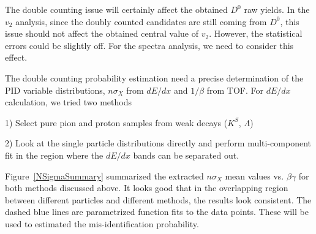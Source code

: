 The double counting issue will certainly affect the obtained $D^0$ raw yields. In the $v_2$ analysis, since the doubly counted candidates are still coming from $D^0$, this issue should not affect the obtained central value of $v_2$. However, the statistical errors could be slightly off. For the spectra analysis, we need to consider this effect.

The double counting probability estimation need a precise determination of the PID variable distributions, $n\sigma_X$ from $dE/dx$ and $1/\beta$ from TOF. For $dE/dx$ calculation, we tried two methods

1) Select pure pion and proton samples from weak decays ($K^{S}$, $\Lambda$)

2) Look at the single particle distributions directly and perform multi-component fit in the region where the $dE/dx$ bands can be separated out.

Figure~\ref{NSigmaSummary} summarized the extracted $n\sigma_{X}$ mean values vs. $\beta\gamma$ for both methods discussed above. It looks good that in the overlapping region between different particles and different methods, the results look consistent. The dashed blue lines are parametrized function fits to the data points. These will be used to estimated the mis-identification probability.

\begin{figure}
\end{figure}

